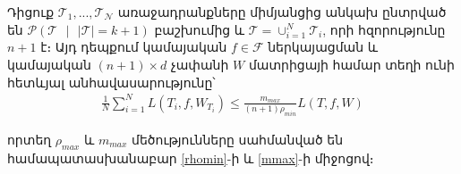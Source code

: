 \documentclass[12pt]{article}
\begin{document}
\begin{lemma}
\label{bs_inequality}
Դիցուք $\mathcal{T}_1, ..., \mathcal{T_N}$ առաջադրանքները միմյանցից անկախ ընտրված են $\mathcal{P}(\mathcal{T} \text{ } |\text{ }  |\mathcal{T}| = k +1)$ բաշխումից և $\mathcal{T} = \cup_{i=1}^N{\mathcal{T}_i}$, որի հզորությունը $n+1$ է։ Այդ դեպքում կամայական $f \in \mathcal{F}$ ներկայացման և  կամայական $(n+1) \times d$ չափանի $W$  մատրիցայի համար տեղի ունի հետևյալ անհավասարությունը՝
\begin{align}
\label{mean_task_ineq}
\frac{1}{N}\sum_{i=1}^N L(T_i, f, W_{T_i}) \leq  \frac{m_{max}}{(n+1) \rho_{min}}  L(T, f, W) 
\end{align}

\noindent որտեղ $\rho_{max}$ և $m_{max}$ մեծությունները սահմանված են համապատասխանաբար \ref{rhomin}-ի և \ref{mmax}-ի միջոցով։
\end{lemma}
\end{document}
